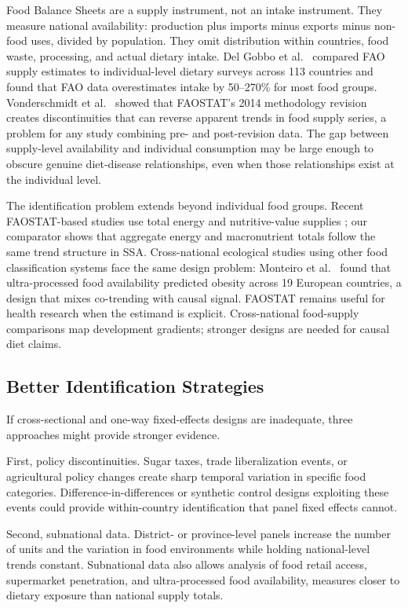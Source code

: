 Food Balance Sheets are a supply instrument, not an intake instrument. They measure national availability: production plus imports minus exports minus non-food uses, divided by population. They omit distribution within countries, food waste, processing, and actual dietary intake. Del Gobbo et al.\ \cite{delgobbo2015} compared FAO supply estimates to individual-level dietary surveys across 113 countries and found that FAO data overestimates intake by 50--270\% for most food groups. Vonderschmidt et al.\ \cite{vonderschmidt2024} showed that FAOSTAT's 2014 methodology revision creates discontinuities that can reverse apparent trends in food supply series, a problem for any study combining pre- and post-revision data. The gap between supply-level availability and individual consumption may be large enough to obscure genuine diet-disease relationships, even when those relationships exist at the individual level.

The identification problem extends beyond individual food groups. Recent FAOSTAT-based studies use total energy and nutritive-value supplies \cite{siminiuc2025,delgadopertinez2026}; our comparator shows that aggregate energy and macronutrient totals follow the same trend structure in SSA. Cross-national ecological studies using other food classification systems face the same design problem: Monteiro et al.\ \cite{monteiro2018} found that ultra-processed food availability predicted obesity across 19 European countries, a design that mixes co-trending with causal signal. FAOSTAT remains useful for health research when the estimand is explicit. Cross-national food-supply comparisons map development gradients; stronger designs are needed for causal diet claims.

\subsection{Better Identification Strategies}

If cross-sectional and one-way fixed-effects designs are inadequate, three approaches might provide stronger evidence.

First, policy discontinuities. Sugar taxes, trade liberalization events, or agricultural policy changes create sharp temporal variation in specific food categories. Difference-in-differences or synthetic control designs exploiting these events could provide within-country identification that panel fixed effects cannot.

Second, subnational data. District- or province-level panels increase the number of units and the variation in food environments while holding national-level trends constant. Subnational data also allows analysis of food retail access, supermarket penetration, and ultra-processed food availability, measures closer to dietary exposure than national supply totals.

